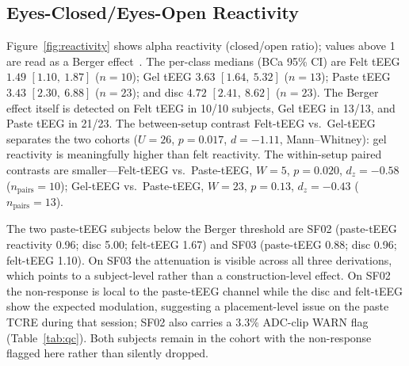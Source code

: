 \documentclass[10pt,a4paper]{article}
\begin{document}
\subsection{Eyes-Closed/Eyes-Open Reactivity}
Figure~\ref{fig:reactivity} shows alpha reactivity (closed/open ratio); values above 1 are read as a Berger effect~\cite{kirschfeld2005}. The per-class medians (BCa 95\% CI) are Felt tEEG $1.49$ $[1.10,\ 1.87]$ ($n=10$); Gel tEEG $3.63$ $[1.64,\ 5.32]$ ($n=13$); Paste tEEG $3.43$ $[2.30,\ 6.88]$ ($n=23$); and disc $4.72$ $[2.41,\ 8.62]$ ($n=23$). The Berger effect itself is detected on Felt tEEG in 10/10 subjects, Gel tEEG in 13/13, and Paste tEEG in 21/23. The between-setup contrast Felt-tEEG vs.\ Gel-tEEG separates the two cohorts ($U=26$, $p=0.017$, $d=-1.11$, Mann--Whitney): gel reactivity is meaningfully higher than felt reactivity. The within-setup paired contrasts are smaller---Felt-tEEG vs.\ Paste-tEEG, $W=5$, $p=0.020$, $d_z=-0.58$ ($n_{\mathrm{pairs}}=10$); Gel-tEEG vs.\ Paste-tEEG, $W=23$, $p=0.13$, $d_z=-0.43$ ($n_{\mathrm{pairs}}=13$).

The two paste-tEEG subjects below the Berger threshold are SF02 (paste-tEEG reactivity 0.96; disc 5.00; felt-tEEG 1.67) and SF03 (paste-tEEG 0.88; disc 0.96; felt-tEEG 1.10). On SF03 the attenuation is visible across all three derivations, which points to a subject-level rather than a construction-level effect. On SF02 the non-response is local to the paste-tEEG channel while the disc and felt-tEEG show the expected modulation, suggesting a placement-level issue on the paste TCRE during that session; SF02 also carries a $3.3\%$ ADC-clip WARN flag (Table~\ref{tab:qc}). Both subjects remain in the cohort with the non-response flagged here rather than silently dropped.
\end{document}
